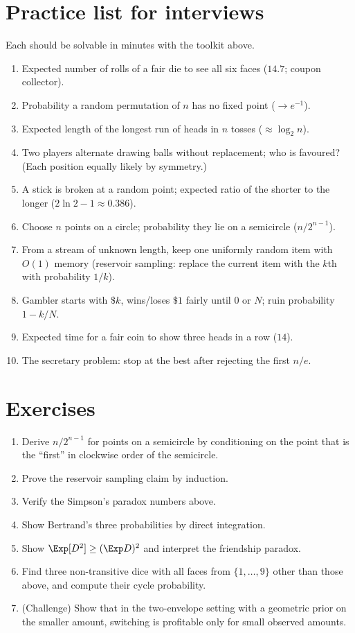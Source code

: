 \section{Practice list for interviews}

Each should be solvable in minutes with the toolkit above.
\begin{enumerate}
\item Expected number of rolls of a fair die to see all six faces ($14.7$; coupon collector).
\item Probability a random permutation of $n$ has no fixed point ($\to e^{-1}$).
\item Expected length of the longest run of heads in $n$ tosses ($\approx\log_2n$).
\item Two players alternate drawing balls without replacement; who is favoured? (Each position equally likely
by symmetry.)
\item A stick is broken at a random point; expected ratio of the shorter to the longer ($2\ln2-1\approx0.386$).
\item Choose $n$ points on a circle; probability they lie on a semicircle ($n/2^{n-1}$).
\item From a stream of unknown length, keep one uniformly random item with $O(1)$ memory (reservoir sampling: replace the
current item with the $k$th with probability $1/k$).
\item Gambler starts with $\$k$, wins/loses $\$1$ fairly until $0$ or $N$; ruin probability $1-k/N$.
\item Expected time for a fair coin to show three heads in a row ($14$).
\item The secretary problem: stop at the best after rejecting the first $n/e$.
\end{enumerate}

\section*{Exercises}

\begin{enumerate}
\item Derive $n/2^{n-1}$ for points on a semicircle by conditioning on the point that is the ``first'' in clockwise
order of the semicircle.
\item Prove the reservoir sampling claim by induction.
\item Verify the Simpson's paradox numbers above.
\item Show Bertrand's three probabilities by direct integration.
\item Show $\Exp[D^2]\ge(\Exp D)^2$ and interpret the friendship paradox.
\item Find three non-transitive dice with all faces from $\{1,\dots,9\}$ other than those above, and compute their cycle
probability.
\item (Challenge) Show that in the two-envelope setting with a geometric prior on the smaller amount, switching is
profitable only for small observed amounts.
\end{enumerate}
